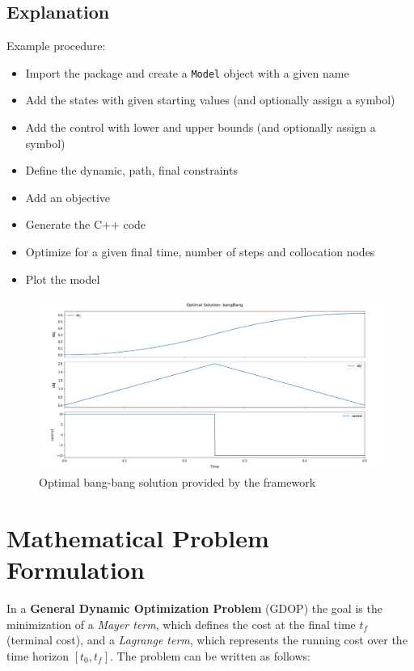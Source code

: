\documentclass[12pt]{article}
\begin{document}
\subsection{Explanation}
Example procedure:
\begin{itemize}
	\item Import the package and create a \texttt{Model} object
	      with a given name
	\item Add the states with given starting values (and optionally
	      assign a symbol)
	\item Add the control with lower and upper bounds (and
	      optionally assign a symbol)
	\item Define the dynamic, path, final constraints
	\item Add an objective
	\item Generate the C++ code
	\item Optimize for a given final time, number of steps and
	      collocation nodes
	\item Plot the model
\end{itemize}

\begin{figure}[H]
	\centering
	\includegraphics[width=\textwidth]{images/bangBang.png}
	\caption{Optimal bang-bang solution provided by the framework}
	\label{fig:bangBang}
\end{figure}
\section{Mathematical Problem Formulation}
\label{c:GDOP}

In a \textbf{General Dynamic Optimization Problem} (GDOP) the goal is the
minimization of a \textit{Mayer term}, which defines the cost at the final time
$t_f$ (terminal cost), and a \textit{Lagrange term}, which represents the
running cost over the time horizon $[t_0, t_f]$. The problem can be written as
follows:
\end{document}
